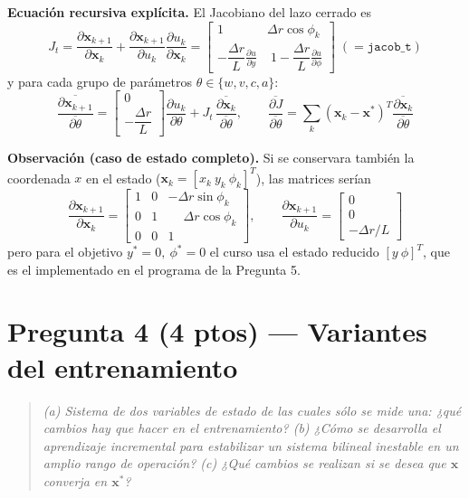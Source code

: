 \documentclass[11pt,a4paper]{article}
\newcommand{\pd}[2]{\frac{\partial #1}{\partial #2}}
\newcommand{\td}[2]{\frac{\overline{\partial #1}}{\overline{\partial #2}}}
\newenvironment{enunciado}
{\begin{quote}\small\itshape\color{azulpucp}}
{\end{quote}}
\begin{document}
\textbf{Ecuación recursiva explícita.} El Jacobiano del lazo cerrado es
\[
J_t=\pd{\mathbf x_{k+1}}{\mathbf x_k}+\pd{\mathbf x_{k+1}}{u_k}\pd{u_k}{\mathbf x_k}
=\begin{bmatrix}
1 & \Delta r\cos\phi_k\\[4pt]
-\dfrac{\Delta r}{L}\pd{u}{y} & \;1-\dfrac{\Delta r}{L}\pd{u}{\phi}
\end{bmatrix}
\;(=\texttt{jacob\_t})
\]
y para cada grupo de parámetros $\theta\in\{w,v,c,a\}$:
\[
\td{\mathbf x_{k+1}}{\theta}
=\begin{bmatrix} 0\\ -\dfrac{\Delta r}{L}\end{bmatrix}\pd{u_k}{\theta}
+J_t\,\td{\mathbf x_k}{\theta},
\qquad
\td{J}{\theta}=\sum_{k}(\mathbf x_k-\mathbf x^{*})^{T}\td{\mathbf x_k}{\theta}
\]

\textbf{Observación (caso de estado completo).} Si se conservara también la coordenada $x$ en el estado ($\mathbf x_k=[x_k\ y_k\ \phi_k]^{T}$), las matrices serían
\[
\pd{\mathbf x_{k+1}}{\mathbf x_k}=
\begin{bmatrix}
1 & 0 & -\Delta r\sin\phi_k\\
0 & 1 & \phantom{-}\Delta r\cos\phi_k\\
0 & 0 & 1
\end{bmatrix},
\qquad
\pd{\mathbf x_{k+1}}{u_k}=\begin{bmatrix}0\\ 0\\ -\Delta r/L\end{bmatrix}
\]
pero para el objetivo $y^{*}=0,\ \phi^{*}=0$ el curso usa el estado reducido $[y\ \phi]^{T}$, que es el implementado en el programa de la Pregunta 5.

\clearpage
\section*{Pregunta 4 (4 ptos) — Variantes del entrenamiento}

\begin{enunciado}
(a) Sistema de dos variables de estado de las cuales sólo se mide una: ¿qué cambios hay que hacer en el entrenamiento? (b) ¿Cómo se desarrolla el aprendizaje incremental para estabilizar un sistema bilineal inestable en un amplio rango de operación? (c) ¿Qué cambios se realizan si se desea que $\mathbf x$ converja en $\mathbf x^{*}$?
\end{enunciado}
\end{document}

